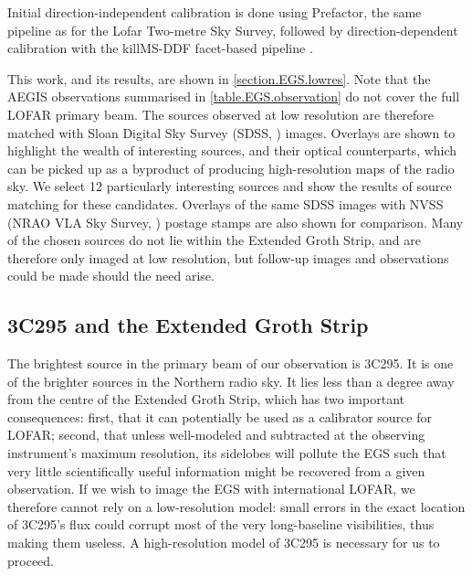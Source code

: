 \pg
Initial direction-independent calibration is done using Prefactor, the same pipeline as for the Lofar Two-metre Sky Survey, followed by direction-dependent calibration with the killMS-DDF facet-based pipeline . %

\pg
This work, and its results, are shown in \cref{section.EGS.lowres}. Note that the AEGIS observations summarised in \cref{table.EGS.observation} do not cover the full LOFAR primary beam. The sources observed at low resolution are therefore matched with Sloan Digital Sky Survey (SDSS, ) images. Overlays are shown to highlight the wealth of interesting sources, and their optical counterparts, which can be picked up as a byproduct of producing high-resolution maps of the radio sky. We select 12 particularly interesting sources and show the results of source matching for these candidates. Overlays of the same SDSS images with NVSS (NRAO VLA Sky Survey, ) postage stamps are also shown for comparison. Many of the chosen sources do not lie within the Extended Groth Strip, and are therefore only imaged at low resolution, but follow-up images and observations could be made should the need arise.


\subsection{3C295 and the Extended Groth Strip}


\pg
The brightest source in the primary beam of our observation is 3C295. It is one of the brighter sources in the Northern radio sky. It lies less than a degree away from the centre of the Extended Groth Strip, which has two important consequences: first, that it can potentially be used as a calibrator source for LOFAR; second, that unless well-modeled and subtracted at the observing instrument's maximum resolution, its sidelobes will pollute the EGS such that very little scientifically useful information might be recovered from a given observation. If we wish to image the EGS with international LOFAR, we therefore cannot rely on a low-resolution model: small errors in the exact location of 3C295's flux could corrupt most of the very long-baseline visibilities, thus making them useless. A high-resolution model of 3C295 is necessary for us to proceed.

